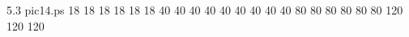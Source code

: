  5.3 pic14.ps 
{}{}{
 18 
 18 
 18 
 18 
 18 
 18 
 40 
 40 
 40 
 40 
 40 
 40 
 40 
 40 
 40 
 80 
 80 
 80 
 80 
 80 
 80 
 120 
 120 
 120 
}
